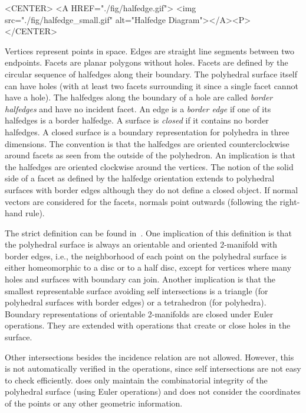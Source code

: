 \begin{ccHtmlOnly}
    <CENTER>
    <A HREF="./fig/halfedge.gif">
        <img src="./fig/halfedge_small.gif" alt="Halfedge Diagram"></A><P>
    </CENTER>
\end{ccHtmlOnly}

Vertices represent points in space. Edges are straight line segments
between two endpoints. Facets are planar polygons without
holes. Facets are defined by the circular sequence of halfedges along
their boundary.  The polyhedral surface itself can have holes (with at
least two facets surrounding it since a single facet cannot have a
hole). The halfedges along the boundary of a hole are called {\em
border halfedges\/} and have no incident facet. An edge is a {\em
border edge\/} if one of its halfedges is a border halfedge.  A
surface is {\em closed\/} if it contains no border halfedges. A closed
surface is a boundary representation for polyhedra in three
dimensions. The convention is that the halfedges are oriented
counterclockwise around facets as seen from the outside of the
polyhedron. An implication is that the halfedges are oriented
clockwise around the vertices. The notion of the solid side of a facet
as defined by the halfedge orientation extends to polyhedral surfaces
with border edges although they do not define a closed object. If
normal vectors are considered for the facets, normals point outwards
(following the right-hand rule).

The strict definition can be found in~\cite{k-ugpdd-99}. One
implication of this definition is that the polyhedral surface is
always an orientable and oriented 2-manifold with border edges, i.e.,
the neighborhood of each point on the polyhedral surface is either
homeomorphic to a disc or to a half disc, except for vertices where
many holes and surfaces with boundary can join. Another implication is
that the smallest representable surface avoiding self intersections is
a triangle (for polyhedral surfaces with border edges) or a
tetrahedron (for polyhedra). Boundary representations of orientable
2-manifolds are closed under Euler operations. They are extended with
operations that create or close holes in the surface.

Other intersections besides the incidence relation are not allowed.
However, this is not automatically verified in the operations, since
self intersections are not easy to check
efficiently.  does only
maintain the combinatorial integrity of the polyhedral surface (using
Euler operations) and does not consider the coordinates of the points
or any other geometric information.

